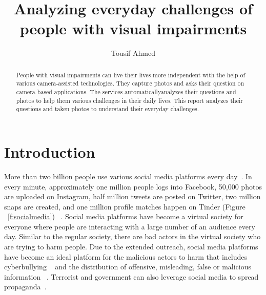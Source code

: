\documentclass[sigconf]{acmart}
\begin{document}
\title{Analyzing everyday challenges of people with visual impairments}


\author{Tousif Ahmed}



\begin{abstract}People with visual impairments can live their lives more independent
       with the help of various camera-assisted technologies. They capture
       photos and asks their question on camera based applications.
       The services automaticallyanalyzes their questions and photos
       to help them various challenges in their daily lives.
       This report analyzes their questions and taken photos
       to understand their everyday challenges.

\end{abstract}



\maketitle





\section{Introduction}
More than two billion people use various social media platforms every day~\cite{social-media}. In every minute, approximately one million people logs into Facebook, 50,000 photos are uploaded on Instagram, half million tweets are posted on Twitter, two million snaps are created, and one million profile matches happen on Tinder (Figure ~\ref{f:socialmedia}) ~\cite{social-media2}. Social media platforms have become a virtual society for everyone where people are interacting with a large number of an audience every day. Similar to the regular society, there are bad actors in the virtual society who are trying to harm people. Due to the extended outreach, social media platforms have become an ideal platform for the malicious actors to harm that includes cyberbullying ~\cite{Slonje:2013,Kwan:2013,Singh:2017,Cheng:2017,HosseinmardiMRH15} and the distribution of offensive, misleading, false or malicious information ~\cite{Menczer:2016, socialbots-CACM, Shao15hoaxy, Shao17hoaxybots}. Terrorist and government can also leverage social media to spread propaganda~\cite{Aro2016, Weimann:2006}.
\end{document}

